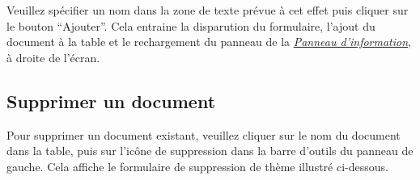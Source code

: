 \documentclass[letterpaper,10pt,french]{sphinxmanual}
\begin{document}

Veuillez spécifier un nom dans la zone de texte prévue à cet effet
puis cliquer sur le bouton ``Ajouter''. Cela entraine la disparution du
formulaire, l'ajout du document à la table et le rechargement du
panneau de la {\hyperref[documents/infopanel::doc]{\emph{\emph{Panneau d'information}}}}, à droite de l'écran.


\subsection{Supprimer un document}
\label{documents/docslist:supprimer-un-document}
Pour supprimer un document existant, veuillez cliquer sur le nom du
document dans la table, puis sur l'icône de suppression dans la barre
d'outils du panneau de gauche. Cela affiche le formulaire de
suppression de thème illustré ci-dessous.

\end{document}

